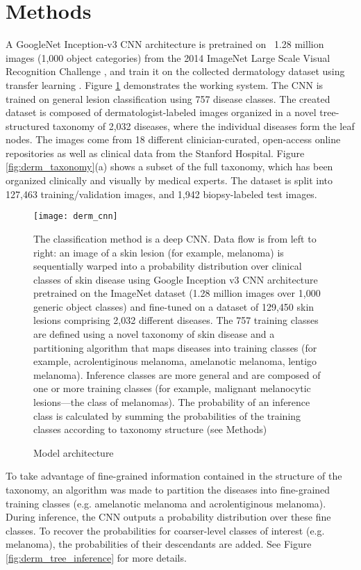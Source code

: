 \section{Methods}

A GoogleNet Inception-v3 CNN architecture \cite{szegedy2016rethinking} is pretrained on ~1.28 million images (1,000 object categories) from the 2014 ImageNet Large Scale Visual Recognition Challenge \cite{russakovsky2015imagenet}, and train it on the collected dermatology dataset using transfer learning \cite{pan2009survey}. Figure \ref{fig:derm_cnn} demonstrates the working system. The CNN is trained on general lesion classification using 757 disease classes. The created dataset is composed of dermatologist-labeled images organized in a novel tree-structured taxonomy of 2,032 diseases, where the individual diseases form the leaf nodes. The images come from 18 different clinician-curated, open-access online repositories as well as clinical data from the Stanford Hospital. Figure \ref{fig:derm_taxonomy}(a) shows a subset of the full taxonomy, which has been organized clinically and visually by medical experts. The dataset is split into 127,463 training/validation images, and 1,942 biopsy-labeled test images.

\begin{figure}
\texttt{[image: derm\_cnn]}
\caption{Model architecture}
\vspace{12px}
The classification method is a deep CNN. Data flow is from left to right: an image of a skin lesion (for example, melanoma) is sequentially warped into a probability distribution over clinical classes of skin disease using Google Inception v3 CNN architecture pretrained on the ImageNet dataset (1.28 million images over 1,000 generic object classes) and fine-tuned on a dataset of 129,450 skin lesions comprising 2,032 different diseases. The 757 training classes are defined using a novel taxonomy of skin disease and a partitioning algorithm that maps diseases into training classes (for example, acrolentiginous melanoma, amelanotic melanoma, lentigo melanoma). Inference classes are more general and are composed of one or more training classes (for example, malignant melanocytic lesions—the class of melanomas). The probability of an inference class is calculated by summing the probabilities of the training classes according to taxonomy structure (see Methods)
\label{fig:derm_cnn}
\end{figure}

To take advantage of fine-grained information contained in the structure of the taxonomy, an algorithm was made to partition the diseases into fine-grained training classes (e.g. amelanotic melanoma and acrolentiginous melanoma). During inference, the CNN outputs a probability distribution over these fine classes. To recover the probabilities for coarser-level classes of interest (e.g. melanoma), the probabilities of their descendants are added. See Figure \ref{fig:derm_tree_inference} for more details.

